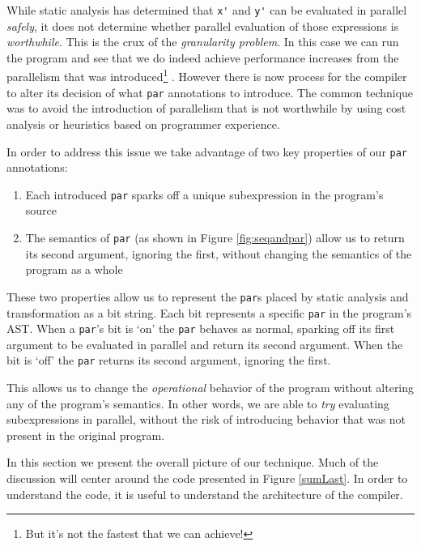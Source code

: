 While static analysis has determined that \verb-x'- and \verb-y'- can be
evaluated in parallel \emph{safely}, it does not determine whether parallel
evaluation of those expressions is \emph{worthwhile}. This is the crux of the
\emph{granularity problem}. In this case we can run the program and see that we
do indeed achieve performance increases from the parallelism that was
introduced\footnote{But it's not the fastest that we can achieve!} . However there is now process for the compiler to alter its
decision of what \verb|par| annotations to introduce. The common technique
was to avoid the introduction of parallelism that is not worthwhile by using
cost analysis or heuristics based on programmer experience.





In order to address this issue we take advantage of
two key properties of our \verb-par- annotations:

\begin{enumerate}
    \item Each introduced \verb-par- sparks off a unique subexpression
            in the program's source
    \item The semantics of \verb-par- (as shown in Figure \ref{fig:seqandpar})
            allow us to return its second argument, ignoring the first,
            without changing the semantics of the program as a whole
\end{enumerate}

These two properties allow us to represent the \verb-par-s placed by static
analysis and transformation as a bit string. Each bit represents a specific
\verb-par- in the program's AST. When a \verb-par-'s bit is `on' the \verb-par-
behaves as normal, sparking off its first argument to be evaluated in parallel
and return its second argument. When the bit is `off' the \verb-par- returns
its second argument, ignoring the first.

This allows us to change the \emph{operational} behavior of the program without
altering any of the program's semantics. In other words, we are able to \emph{try}
evaluating subexpressions in parallel, without the risk of introducing behavior
that was not present in the original program.


In this section we present the overall picture of our technique. Much of the
discussion will center around the code presented in Figure \ref{sumLast}. In
order to understand the code, it is useful to understand the architecture of the
compiler.

